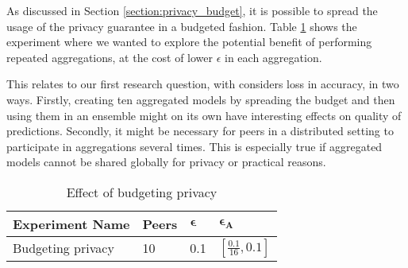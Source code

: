 As discussed in Section \ref{section:privacy_budget}, it is possible to spread the usage of the privacy guarantee in a budgeted fashion. Table \ref{tab:experiments_budgeting_privacy} shows the experiment where we wanted to explore the potential benefit of performing repeated aggregations, at the cost of lower $\epsilon$ in each aggregation. 

This relates to our first research question, with considers loss in accuracy, in two ways. Firstly, creating ten aggregated models by spreading the budget and then using them in an ensemble might on its own have interesting effects on quality of predictions. Secondly, it might be necessary for peers in a distributed setting to participate in aggregations several times. This is especially true if aggregated models cannot be shared globally for privacy or practical reasons.

\begin{table}[h]
	\centering	
	\begin{tabular}{|l|l|l|l|}
		{\bf Experiment Name} & {\bf Peers} & $\boldsymbol{\epsilon}$ & $\boldsymbol{\epsilon_A}$        \\
		\hline
		Budgeting privacy & 10    & 0.1     & $[\frac{0.1}{16}, 0.1]$
	\end{tabular}
	\caption{Effect of budgeting privacy}
	\label{tab:experiments_budgeting_privacy}
\end{table}
